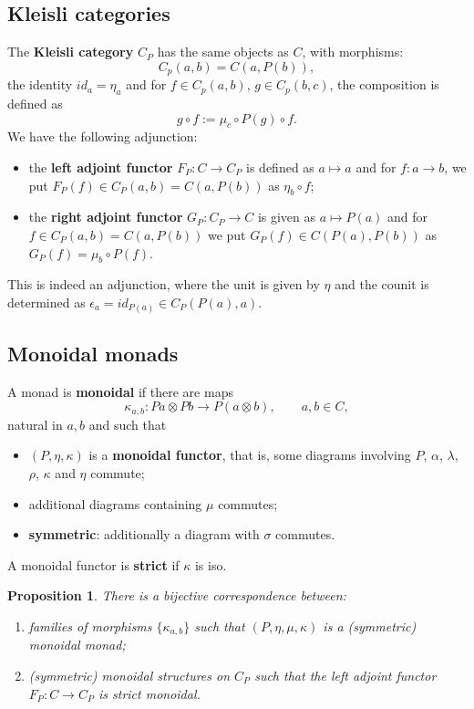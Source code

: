 \documentclass[12pt]{article}
\newtheorem{prop}{Proposition}
\theoremstyle{definition}
\theoremstyle{remark}
\begin{document}
\subsection{Kleisli categories}

The \textbf{Kleisli category} $C_P$ has the same objects as $C$, with morphisms:
\[
C_p(a,b)=C(a,P(b)),
\]
the identity $id_a=\eta_a$ and for $f\in C_p(a,b)$, $g\in C_p(b,c)$, the composition is defined as
\[
g\circ f:=\mu_c\circ P(g)\circ f.
\]
We have the following adjunction:
\begin{itemize}
\item the \textbf{left adjoint functor} $F_P: C\to C_P$ is defined as $a\mapsto a$ and for $f:a\to b$, we
put $F_P(f)\in C_P(a,b)=C(a,P(b))$ as $\eta_b\circ f$;

\item the \textbf{right adjoint functor} $G_P:C_P\to C$ is
given as $a\mapsto P(a)$ and for $f\in C_P(a,b)=C(a,P(b))$ we put $G_P(f)\in C(P(a),P(b))$
as $G_P(f)=\mu_b\circ P(f)$. 


\end{itemize}
This is indeed an adjunction, where the unit is given by $\eta$ and the counit is
determined as $\epsilon_a=id_{P(a)}\in C_P(P(a),a)$.


\subsection{Monoidal monads}

 A monad is \textbf{monoidal} \cite{seal2013tensors} if there are maps
 \[
\kappa_{a,b}:Pa\otimes Pb\to P(a\otimes b),\qquad a,b\in C,
 \]
 natural in $a,b$ and such that 
 \begin{itemize}
\item $(P,\eta, \kappa)$ is a \textbf{monoidal functor}, that is, some diagrams involving
$P$, $\alpha$, $\lambda$, $\rho$, $\kappa$ and $\eta$ commute;
\item additional diagrams containing $\mu$ commutes;
\item\textbf{symmetric}: additionally a diagram with $\sigma$ commutes. 

 \end{itemize}
A monoidal functor is \textbf{strict} if $\kappa$ is iso.

\begin{prop}\cite[Prop. 1.2.2]{seal2013tensors}  There is a bijective correspondence
between:
\begin{enumerate}
\item[(i)] families of morphisms $\{\kappa_{a,b}\}$ such that $(P,\eta,\mu,\kappa)$ is a
(symmetric)
monoidal monad;
\item[(ii)] (symmetric) monoidal structures on $C_P$ such that the left adjoint functor $F_P:C\to C_P$
is strict monoidal.

\end{enumerate}

\end{prop}
\end{document}
